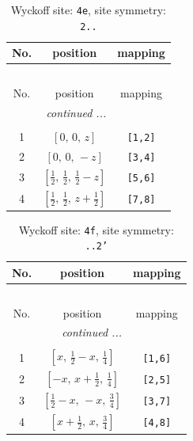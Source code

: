 \documentclass[fleqn,8pt]{jsarticle}
\begin{document}
\begin{longtable}{ccc}
\caption{Wyckoff site: {\tt 4e}, site symmetry: {\tt 2..}}
 \\
 \hline \hline
No. & position & mapping \\ \hline \endfirsthead

\multicolumn{2}{l}{\tablename\ \thetable{}} \\
 \hline \hline
No. & position & mapping \\ \hline \endhead

 \hline \hline
\multicolumn{2}{r}{\footnotesize\it continued ...} \\ \endfoot

 \hline \hline
\multicolumn{2}{r}{} \\ \endlastfoot

1 & $\left[ 0,\, 0,\, z \right]$ & {\tt [1,2]} \\ \hline
2 & $\left[ 0,\, 0,\, - z \right]$ & {\tt [3,4]} \\ \hline
3 & $\left[ \frac{1}{2},\, \frac{1}{2},\, \frac{1}{2} - z \right]$ & {\tt [5,6]} \\ \hline
4 & $\left[ \frac{1}{2},\, \frac{1}{2},\, z + \frac{1}{2} \right]$ & {\tt [7,8]} \\
\end{longtable}
\renewcommand{\arraystretch}{1.2}
\begin{longtable}{ccc}
\caption{Wyckoff site: {\tt 4f}, site symmetry: {\tt ..2'}}
 \\
 \hline \hline
No. & position & mapping \\ \hline \endfirsthead

\multicolumn{2}{l}{\tablename\ \thetable{}} \\
 \hline \hline
No. & position & mapping \\ \hline \endhead

 \hline \hline
\multicolumn{2}{r}{\footnotesize\it continued ...} \\ \endfoot

 \hline \hline
\multicolumn{2}{r}{} \\ \endlastfoot

1 & $\left[ x,\, \frac{1}{2} - x,\, \frac{1}{4} \right]$ & {\tt [1,6]} \\ \hline
2 & $\left[ - x,\, x + \frac{1}{2},\, \frac{1}{4} \right]$ & {\tt [2,5]} \\ \hline
3 & $\left[ \frac{1}{2} - x,\, - x,\, \frac{3}{4} \right]$ & {\tt [3,7]} \\ \hline
4 & $\left[ x + \frac{1}{2},\, x,\, \frac{3}{4} \right]$ & {\tt [4,8]} \\
\end{longtable}
\end{document}
